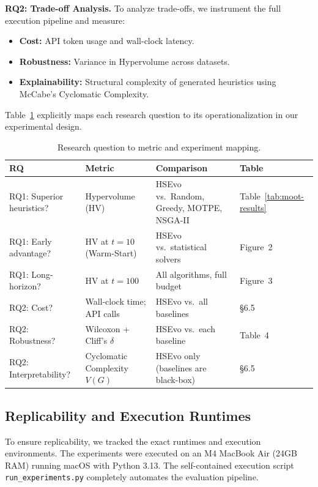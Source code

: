 \documentclass[sigconf,nonacm]{acmart}
\begin{document}
\textbf{RQ2: Trade-off Analysis.}
To analyze trade-offs, we instrument the full execution pipeline and measure:
\begin{itemize}
    \item \textbf{Cost:} API token usage and wall-clock latency.
    \item \textbf{Robustness:} Variance in Hypervolume across datasets.
    \item \textbf{Explainability:} Structural complexity of generated heuristics using McCabe's Cyclomatic Complexity.
\end{itemize}

Table~\ref{tab:rq-map} explicitly maps each research question
to its operationalization in our experimental design.

\begin{table}[h]
\caption{Research question to metric and experiment mapping.}
\label{tab:rq-map}
\small
\begin{tabular}{p{1.8cm}p{2.2cm}p{2.2cm}p{1.4cm}}
\toprule
\textbf{RQ} & \textbf{Metric} & \textbf{Comparison} &
\textbf{Table} \\
\midrule
RQ1: Superior heuristics? & Hypervolume (HV) & HSEvo vs.\
Random, Greedy, MOTPE, NSGA-II & Table~\ref{tab:moot-results} \\
RQ1: Early advantage? & HV at $t=10$ (Warm-Start) &
HSEvo vs.\ statistical solvers & Figure~2 \\
RQ1: Long-horizon? & HV at $t=100$ & All algorithms,
full budget & Figure~3 \\
RQ2: Cost? & Wall-clock time; API calls & HSEvo vs.\
all baselines & \S6.5 \\
RQ2: Robustness? & Wilcoxon + Cliff's $\delta$ &
HSEvo vs.\ each baseline & Table~4 \\
RQ2: Interpretability? & Cyclomatic Complexity $V(G)$ &
HSEvo only (baselines are black-box) & \S6.5 \\
\bottomrule
\end{tabular}
\end{table}
\subsection{Replicability and Execution Runtimes}

To ensure replicability, we tracked the exact runtimes and execution environments. The experiments were executed on an M4 MacBook Air (24GB RAM) running macOS with Python 3.13. The self-contained execution script \texttt{run\_experiments.py} completely automates the evaluation pipeline.
\end{document}
